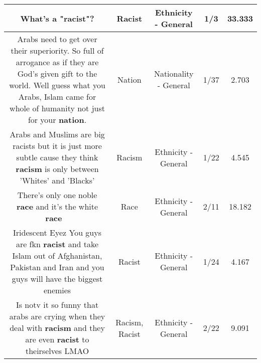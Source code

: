 \documentclass[11pt]{article}
\newlength\mylength
\begin{document}
\begin{center}
\begin{longtable}{|C{.65\mylength}|C{.30\mylength}|C{.12\mylength}|C{.12\mylength}|C{.12\mylength}|}
  \small What's a "\textbf{racist}"?\normalsize   & Racist & Ethnicity - General & 1/3 & 33.333 \\  \hline
  \small Arabs need to get over their superiority. So full of arrogance as if they are God's given gift to the world. Well guess what you Arabs, Islam came for whole of humanity not just for your \textbf{nation}.\normalsize   & Nation & Nationality - General & 1/37 & 2.703 \\  \hline
  \small Arabs and Muslims are big racists but it is just more subtle cause they think \textbf{racism} is only between 'Whites' and 'Blacks'\normalsize   & Racism & Ethnicity - General & 1/22 & 4.545 \\  \hline
  \small There's only one noble \textbf{race} and it's the white \textbf{race} 💪🏻\normalsize   & Race & Ethnicity - General & 2/11 & 18.182 \\  \hline
  \small Iridescent Eyez You guys are fkn \textbf{racist} and take Islam out of Afghanistan, Pakistan and Iran and you guys will have the biggest enemies\normalsize   & Racist & Ethnicity - General & 1/24 & 4.167 \\  \hline
  \small Is notv it so funny that arabs are crying when they deal with \textbf{racism} and they are even \textbf{racist} to theirselves LMAO\normalsize   & Racism, Racist & Ethnicity - General & 2/22 & 9.091 \\  \hline

\end{longtable}
\end{center}
\end{document}

